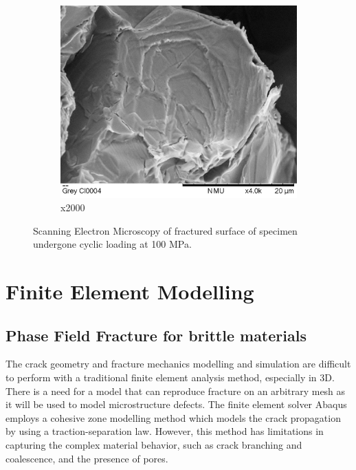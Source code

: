 \documentclass[11pt,a4paper]{article}
\begin{document}
\begin{figure} [ht]
\begin{subfigure}{0.335\textwidth}
\includegraphics[scale=0.32]{Grey CI0004(x4.0k).png}
\caption{x2000}
\label{brittle}
\end{subfigure}
\caption{Scanning Electron Microscopy of fractured surface of specimen undergone cyclic loading at 100 MPa.}
\label{SEM}
\end{figure}

\section{Finite Element Modelling}
\subsection{Phase Field Fracture for brittle materials}
The crack geometry and fracture mechanics modelling and simulation are difficult to perform with a traditional finite element analysis method, especially in 3D. There is a need for a model that can reproduce fracture on an arbitrary mesh as it will be used to model microstructure defects. The finite element solver Abaqus employs a cohesive zone modelling method which models the crack propagation by using a traction-separation law. However, this method has limitations in capturing the complex material behavior, such as crack branching and coalescence, and the presence of pores.
\end{document}
